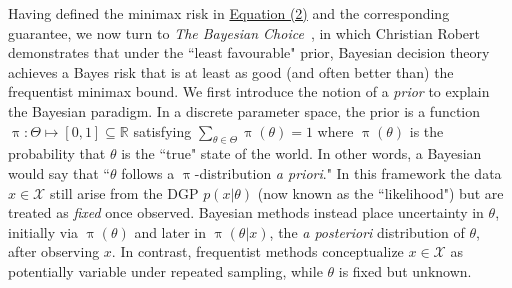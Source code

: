 \documentclass[letterpaper,12pt]{article}
\newcommand{\given}{|}
\begin{document}
Having defined the minimax risk in \hyperref[eq:minimaxrisk]{Equation (2)} and the corresponding guarantee, we now turn to \textit{The Bayesian Choice} \cite{robert2007bayesian}, in which Christian Robert demonstrates that under the ``least favourable" prior, Bayesian decision theory achieves a Bayes risk that is at least as good (and often better than) the frequentist minimax bound. We first introduce the notion of a \textit{prior} to explain the Bayesian paradigm. In a discrete parameter space, the prior is a function $\uppi: \Theta \mapsto [0,1] \subseteq \mathbb{R}$ satisfying $\sum_{\theta \in \Theta} \uppi (\theta) = 1$ where $\uppi(\theta)$ is the probability that $\theta$ is the ``true" state of the world. In other words, a Bayesian would say that ``$\theta$ follows a $\uppi$-distribution \textit{a priori}." In this framework the data $x \in \mathcal{X}$ still arise from the DGP $p(x \given \theta)$ (now known as the ``likelihood") but are treated as \textit{fixed} once observed. Bayesian methods instead place uncertainty in $\theta$, initially via $\uppi(\theta)$ and later in $\uppi(\theta \given x)$, the \textit{a posteriori} distribution of $\theta$, after observing $x$. In contrast, frequentist methods conceptualize $x \in \mathcal{X}$ as potentially variable under repeated sampling, while $\theta$ is fixed but unknown.
\end{document}
